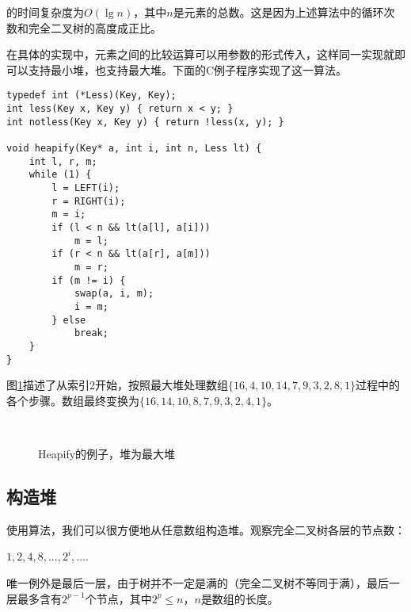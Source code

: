 \documentclass[UTF8]{article}
\begin{document}
的时间复杂度为$O(\lg n)$，其中$n$是元素的总数。这是因为上述算法中的循环次数和完全二叉树的高度成正比。

在具体的实现中，元素之间的比较运算可以用参数的形式传入，这样同一实现就即可以支持最小堆，也支持最大堆。下面的C例子程序实现了这一算法。

\begin{lstlisting}
typedef int (*Less)(Key, Key);
int less(Key x, Key y) { return x < y; }
int notless(Key x, Key y) { return !less(x, y); }

void heapify(Key* a, int i, int n, Less lt) {
    int l, r, m;
    while (1) {
        l = LEFT(i);
        r = RIGHT(i);
        m = i;
        if (l < n && lt(a[l], a[i]))
            m = l;
        if (r < n && lt(a[r], a[m]))
            m = r;
        if (m != i) {
            swap(a, i, m);
            i = m;
        } else
            break;
    }
}
\end{lstlisting}

图\ref{fig:heapify}描述了从索引2开始，按照最大堆处理数组$\{16, 4, 10, 14, 7, 9, 3, 2, 8, 1\}$过程中的各个步骤。数组最终变换为$\{16, 14, 10, 8, 7, 9, 3, 2, 4, 1\}$。

\begin{figure}[htbp]
    \centering
     \hspace{0.01\textwidth}
     \\
    \caption{Heapify的例子，堆为最大堆} \label{fig:heapify}
\end{figure}


\subsection{构造堆}

使用算法，我们可以很方便地从任意数组构造堆。观察完全二叉树各层的节点数：

$1, 2, 4, 8, ..., 2^i, ...$.

唯一例外是最后一层，由于树并不一定是满的（完全二叉树不等同于满），最后一层最多含有$2^{p-1}$个节点，其中$2^p \leq n$，$n$是数组的长度。
\end{document}
